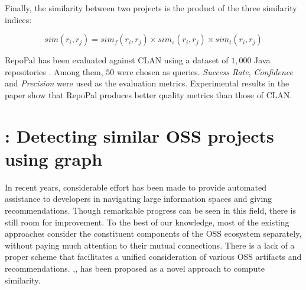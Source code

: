 
Finally, the similarity between two projects is the product of the three similarity indices: %

\begin{equation} \label{eqn:RepoPalSim}
sim(r_i,r_j) = sim_{f}(r_i,r_j) \times sim_{s}(r_i,r_j) \times sim_{t}(r_i,r_j)
\end{equation}

RepoPal has been evaluated against CLAN using a dataset of $1,000$ Java repositories \cite{10.1109/SANER.2017.7884605}. Among them, $50$ were chosen as queries. {\em Success Rate}, {\em Confidence} and {\em Precision} were used as the evaluation metrics. Experimental results in the paper show that RepoPal produces better quality metrics than those of CLAN.







\section{\CrossSim: Detecting similar OSS projects using graph}

In recent years, considerable effort has been made to provide automated assistance to developers in navigating large information spaces and giving recommendations. Though remarkable progress can be seen in this field, there is still room for improvement. To the best of our knowledge, most of the existing approaches consider the constituent components of the OSS ecosystem separately, without paying much attention to their mutual connections. There is a lack of a proper scheme that facilitates a unified consideration of various OSS artifacts and recommendations. \CrossSim \cite{NDRDSEAA2018},\cite{NDD:KaRS:2018},\cite{DBLP:conf/iir/NDD013} has been proposed as a novel approach to compute similarity.
 
